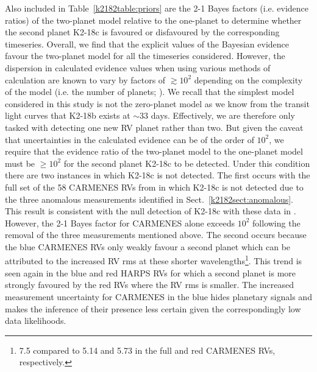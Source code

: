 Also included in Table~\ref{k2182table:priors} are the 2-1 Bayes factors (i.e. evidence ratios) of the
two-planet model relative to the one-planet to determine whether the second planet K2-18c is favoured or disfavoured by the
corresponding timeseries. Overall, we find that the explicit values of the Bayesian
evidence favour the two-planet model for {all} the timeseries considered. However, the dispersion in calculated
evidence values when using various methods of calculation are known to vary by factors of $\gtrsim 10^2$
depending on the complexity of the model (i.e. the number of planets; \citealt{nelson18}). We recall that the
simplest model considered in this study is not the zero-planet model as we know from the transit light curves
that K2-18b exists at $\sim 33$ days. Effectively, we are therefore only tasked with detecting one new RV planet
rather than two. But given the caveat that uncertainties in the calculated evidence
can be of the order of $10^2$, we require that the evidence ratio of the two-planet model to the one-planet model must
be $\geq 10^2$ for the second planet K2-18c to be detected. Under this condition there are two instances
in which K2-18c is not detected. The first occurs with the full set of the 58 CARMENES RVs from
 in which K2-18c is not detected due to the three anomalous measurements identified
in Sect.~\ref{k2182sect:anomalous}. This result is consistent with the null detection of K2-18c with these data
in . However, the 2-1 Bayes factor for CARMENES alone exceeds $10^2$ following the
removal of the three  measurements mentioned above. The second occurs because  the blue CARMENES RVs only weakly favour a
second planet which can be attributed to the increased RV rms at these shorter wavelengths\footnote{
  7.5 \mps{} compared to 5.14 and 5.73 \mps{} in the full and red CARMENES RVs, respectively.}. This trend
is seen again in the blue and red HARPS RVs for which a second planet is more strongly favoured
by the red RVs where the RV rms is smaller. The increased measurement uncertainty for CARMENES in the
blue hides planetary signals and makes the inference of their presence less certain given
the correspondingly low data likelihoods.






